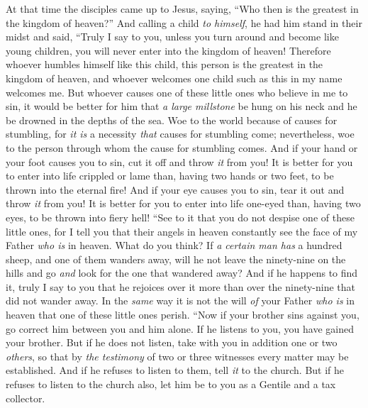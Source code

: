 \begin{biblechapter} %
 At that time the disciples came up to Jesus, saying, “Who then is the greatest in the kingdom of heaven?”
\verse And calling a child \textit{to himself}, he had him stand in their midst
\verse and said, “Truly I say to you, unless you turn around and become like young children, you will never enter into the kingdom of heaven!
\verse Therefore whoever humbles himself like this child, this person is the greatest in the kingdom of heaven,
\verse and whoever welcomes one child such as this in my name welcomes me.
\verse But whoever causes one of these little ones who believe in me to sin, it would be better for him that \textit{a large millstone} be hung on his neck and he be drowned in the depths of the sea.
\verse Woe to the world because of causes for stumbling, for \textit{it is} a necessity \textit{that} causes for stumbling come; nevertheless, woe to the person through whom the cause for stumbling comes.
\verse And if your hand or your foot causes you to sin, cut it off and throw \textit{it} from you! It is better for you to enter into life crippled or lame than, having two hands or two feet, to be thrown into the eternal fire!
\verse And if your eye causes you to sin, tear it out and throw \textit{it} from you! It is better for you to enter into life one-eyed than, having two eyes, to be thrown into fiery hell!
 “See to it that you do not despise one of these little ones, for I tell you that their angels in heaven constantly see the face of my Father \textit{who is} in heaven.
\verse What do you think? If \textit{a certain man has} a hundred sheep, and one of them wanders away, will he not leave the ninety-nine on the hills and go \textit{and} look for the one that wandered away?
\verse And if he happens to find it, truly I say to you that he rejoices over it more than over the ninety-nine that did not wander away.
\verse In the \textit{same} way it is not the will \textit{of} your Father \textit{who is} in heaven that one of these little ones perish.
 “Now if your brother sins against you, go correct him between you and him alone. If he listens to you, you have gained your brother.
\verse But if he does not listen, take with you in addition one or two \textit{others}, so that by \textit{the testimony} of two or three witnesses every matter may be established.
\verse And if he refuses to listen to them, tell \textit{it} to the church. But if he refuses to listen to the church also, let him be to you as a Gentile and a tax collector.

\end{biblechapter}
